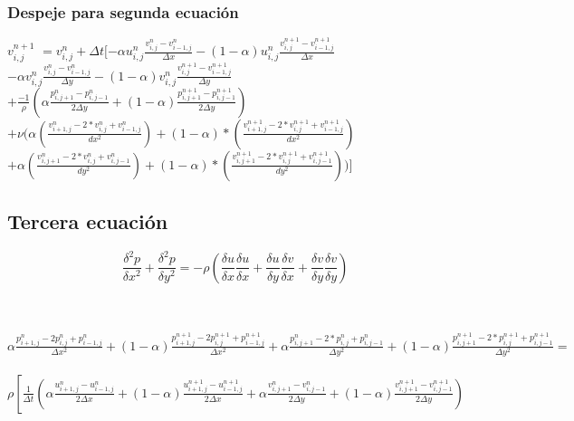 \documentclass[a4paper]{article}
\begin{document}
~\\
~\\

\subsubsection{Despeje para segunda ecuación}

$ {v}^{n+1}_{i,j}  $
$= v^{n}_{i,j} + \Delta t [- \alpha {u}^{n}_{i,j} \frac{ {v}^{n}_{i,j} - v^{n}_{i-1,j}}{ \Delta x} - (1 - \alpha) {u}^{n}_{i,j} \frac{ {v}^{n+1}_{i,j} - v^{n+1}_{i-1,j}}{ \Delta x}$ 
\\
$- \alpha {v}^{n}_{i,j} \frac{ {v}^{n}_{i,j} - v^{n}_{i-1,j}}{ \Delta y} - (1 - \alpha) {v}^{n}_{i,j} \frac{ {v}^{n+1}_{i,j} - v^{n+1}_{i-1,j}}{ \Delta y}$
\\
$+ \frac{-1}{\rho} ( \alpha \frac{p^{n}_{i,j+1} - p^{n}_{i,j-1} }{ 2 \Delta y } + (1 - \alpha) \frac{p^{n+1}_{i,j+1} - p^{n+1}_{i,j-1} }{ 2 \Delta y })  $
\\
$+ \nu (\alpha (\frac{ v^{n}_{i+1,j} - 2*v^{n}_{i,j} + v^{n}_{i-1,j}}{dx^2}) + (1-\alpha)*(\frac{ v^{n+1}_{i+1,j} - 2*v^{n+1}_{i,j} + v^{n+1}_{i-1,j}}{dx^2})$
\\
$+ \alpha (\frac{ v^{n}_{i,j+1} - 2*v^{n}_{i,j} + v^{n}_{i,j-1}}{dy^2}) + (1-\alpha)*(\frac{ v^{n+1}_{i,j+1} - 2*v^{n+1}_{i,j} + v^{n+1}_{i,j-1}}{dy^2}))]$



\subsection{Tercera ecuación}


$$ \frac{\delta^{2}p}{\delta x^{2}} + \frac{\delta^{2}p}{\delta y^{2}} = -\rho (\frac{\delta u}{\delta x} \frac{\delta u}{\delta x} + \frac{\delta u}{\delta y} \frac{\delta v}{\delta x} + \frac{\delta v}{\delta y}\frac{\delta v}{\delta y})$$


~\\
~\\

$ \alpha \frac{p_{i+1,j}^{n}-2p_{i,j}^{n}+p_{i-1,j}^{n}}{\Delta x^2} + (1-\alpha) \frac{p_{i+1,j}^{n+1}-2p_{i,j}^{n+1}+p_{i-1,j}^{n+1}}{\Delta x^2} + \alpha \frac{p_{i,j+1}^{n}-2*p_{i,j}^{n}+p_{i,j-1}^{n}}{\Delta y^2} + (1-\alpha) \frac{p_{i,j+1}^{n+1}-2*p_{i,j}^{n+1}+p_{i,j-1}^{n+1}}{\Delta y^2} = $
~\\
$\rho\left[\frac{1}{\Delta t} \left( \alpha \frac{u_{i+1,j}^{n} -u_{i-1,j}^{n} }{2\Delta x} + (1-\alpha) \frac{u_{i+1,j}^{n+1} -u_{i-1,j}^{n+1} }{2\Delta x} + \alpha \frac{v_{i,j+1}^{n} - v_{i,j-1}^{n}}{2\Delta y} + (1-\alpha) \frac{v_{i,j+1}^{n+1} - v_{i,j-1}^{n+1}}{2\Delta y} \right)\right.$
\end{document}
